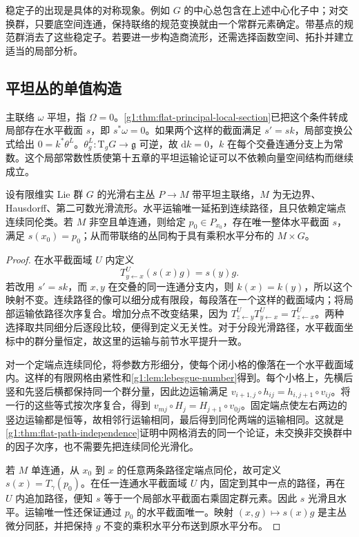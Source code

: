 稳定子的出现是具体的对称现象。例如 \(G\) 的中心总包含在上述中心化子中；对交换群，只要底空间连通，保持联络的规范变换就由一个常群元素确定。带基点的规范群消去了这些稳定子。若要进一步构造商流形，还需选择函数空间、拓扑并建立适当的局部分析。

\subsection{平坦丛的单值构造}
\label{g1:subsec:1804:03}

主联络 \(\omega\) 平坦，指 \(\Omega=0\)。\cref{g1:thm:flat-principal-local-section}已把这个条件转成局部存在水平截面 \(s\)，即 \(s^*\omega=0\)。如果两个这样的截面满足 \(s'=s k\)，局部变换公式给出 \(0=k^*\theta^L\)。\(\theta^L_g:\mathrm{T}_gG\to\mathfrak g\) 可逆，故 \(\mathrm{d}k=0\)，\(k\) 在每个交叠连通分支上为常数。这个局部常数性质使第十五章的平坦运输论证可以不依赖向量空间结构而继续成立。

\begin{proposition}\label{g1:prop:flat-principal-homotopy}
	设有限维实 Lie 群 \(G\) 的光滑右主丛 \(P\to M\) 带平坦主联络，\(M\) 为无边界、Hausdorff、第二可数光滑流形。水平运输唯一延拓到连续路径，且只依赖定端点连续同伦类。若 \(M\) 非空且单连通，则给定 \(p_0\in P_{x_0}\)，存在唯一整体水平截面 \(s\)，满足 \(s(x_0)=p_0\)；从而带联络的丛同构于具有乘积水平分布的 \(M\times G\)。
\end{proposition}
\begin{proof}
	在水平截面域 \(U\) 内定义
	\[
		T^U_{y\leftarrow x}(s(x)g)=s(y)g.
	\]
	若改用 \(s'=s k\)，而 \(x,y\) 在交叠的同一连通分支内，则 \(k(x)=k(y)\)，所以这个映射不变。连续路径的像可以细分成有限段，每段落在一个这样的截面域内；将局部运输依路径次序复合。增加分点不改变结果，因为 \(T^U_{z\leftarrow y}T^U_{y\leftarrow x}=T^U_{z\leftarrow x}\)。两种选择取共同细分后逐段比较，便得到定义无关性。对于分段光滑路径，水平截面坐标中的群分量恒定，故这里的运输与前节水平提升一致。

	对一个定端点连续同伦，将参数方形细分，使每个闭小格的像落在一个水平截面域内。这样的有限网格由紧性和\cref{g1:lem:lebesgue-number}得到。每个小格上，先横后竖和先竖后横都保持同一个群分量，因此边运输满足 \(v_{i+1,j}\circ h_{ij}=h_{i,j+1}\circ v_{ij}\)。将一行的这些等式按次序复合，得到 \(v_{mj}\circ H_j=H_{j+1}\circ v_{0j}\)。固定端点使左右两边的竖边运输都是恒等，故相邻行运输相同，最后得到同伦两端的运输相同。这就是\cref{g1:thm:flat-path-independence}证明中网格消去的同一个论证，未交换非交换群中的因子次序，也不需要先把连续同伦光滑化。

	若 \(M\) 单连通，从 \(x_0\) 到 \(x\) 的任意两条路径定端点同伦，故可定义 \(s(x)=T_\gamma(p_0)\)。在任一连通水平截面域 \(U\) 内，固定到其中一点的路径，再在 \(U\) 内追加路径，便知 \(s\) 等于一个局部水平截面右乘固定群元素。因此 \(s\) 光滑且水平。运输唯一性还保证通过 \(p_0\) 的水平截面唯一。映射 \((x,g)\mapsto s(x)g\) 是主丛微分同胚，并把保持 \(g\) 不变的乘积水平分布送到原水平分布。
\end{proof}

